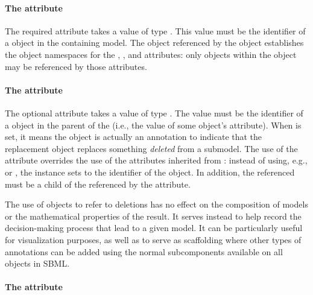 \paragraph{The \fixttspace{} attribute}
\label{replacedelement-submodelref}

The required attribute  takes a value of type .  This value must be the identifier of a \Submodel object in the containing model.  The \Model object referenced by the \Submodel object establishes the object namespaces for the , ,  and  attributes: only objects within the \Model object may be referenced by those attributes.


\paragraph{The \fixttspace{} attribute}
\label{replacedelement-deletion}

The optional attribute  takes a value of type .  The value must be the identifier of a \Deletion object in the parent \Model of the \ReplacedElement (i.e., the value of some \Deletion object's  attribute).  When  is set, it means the \ReplacedElement object is actually an annotation to indicate that the replacement object replaces something \emph{deleted} from a submodel.  The use of the  attribute overrides the use of the attributes inherited from \SBaseRef: instead of using, e.g.,  or , the \ReplacedElement instance sets  to the identifier of the \Deletion object.  In addition, the referenced \Deletion must be a child of the \Submodel referenced by the  attribute.

The use of \ReplacedElement objects to refer to deletions has no effect on the composition of models or the mathematical properties of the result.  It serves instead to help record the decision-making process that lead to a given model.  It can be particularly useful for visualization purposes, as well as to serve as scaffolding where other types of annotations can be added using the normal \Annotation subcomponents available on all \SBase objects in SBML.




\paragraph{The \fixttspace{} attribute}
\label{replacedelement-conversionfactor}

